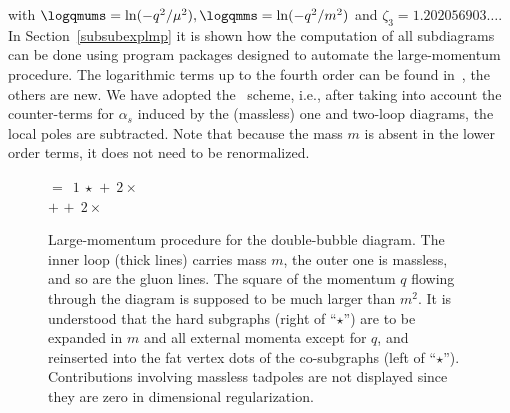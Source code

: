 with $\logqmums=\ln(-q^2/\mu^2), \logqmms=\ln(-q^2/m^2)$ and
$\zeta_3=1.202056903\ldots$.  In Section~\ref{subsubexplmp} it is
shown how the computation of all subdiagrams can be done using program
packages designed to automate the large-momentum procedure.  The
logarithmic terms up to the fourth order can be found
in~\cite{CheKue94}, the others are new. We have adopted the
\msbar~scheme, i.e., after taking into account the counter-terms for
$\alpha_s$ induced by the (massless) one and two-loop diagrams, the
local poles are subtracted.  Note that because the mass $m$ is absent in
the lower order terms, it does not need to be renormalized.

\begin{figure}[t]
  \begin{center}
  \leavevmode
   \epsfxsize=3cm
   \hspace{1em}
   \raisebox{2.8em}
   {\Large $= \ \ 1\ \star $}
   \hspace{0em}
   \raisebox{2.8em}
   {\Large $+ \ \ 2\times \!\!$}
   \epsfxsize=1.5cm
   \hspace{0em}
   \raisebox{2.8em}{\Large $\star$}
   \hspace{1em}\\[1em]
   \mbox{\hspace{1em}}\raisebox{2.8em}
   {\Large $+$}
   \epsfxsize=1.5cm
   \raisebox{2.8em}{\Large $\star$}
   \hspace{0em}
   \hspace{.5em}\raisebox{2.8em}
   {\Large $+ \ \ 2\times \!\!\!\!$}
   \epsfxsize=3cm
   \epsfxsize=3cm
   \raisebox{2.8em}{\Large $\star$}
   \hspace{0em}
   \parbox{\captionwidth}{
   \caption[]{\label{figdblmp} \sloppy
     Large-momentum procedure for the double-bubble diagram.
     The inner loop (thick lines)
     carries mass $m$, the outer one is massless, and so are the gluon
     lines. The square of the momentum $q$ flowing through
     the diagram is supposed to be much larger than $m^2$.  It is
     understood that the hard subgraphs (right of ``$\star$'') are to be
     expanded in $m$ and all external momenta except for $q$, and
     reinserted into the fat vertex dots of the co-subgraphs (left of
     ``$\star$'').  Contributions involving massless tadpoles are not
     displayed since they are zero in dimensional regularization.}}
 \end{center}
\end{figure}


